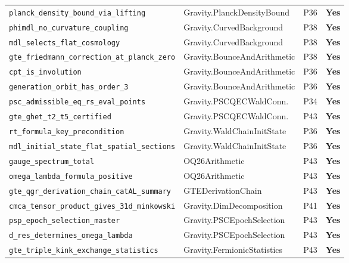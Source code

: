 \begin{longtable}{@{}p{6.3cm}p{4.6cm}p{1.5cm}p{1.5cm}@{}}
\lstinline|planck_density_bound_via_lifting|         & Gravity.PlanckDensityBound   & P36  & \textbf{Yes} \\
\lstinline|phimdl_no_curvature_coupling|             & Gravity.CurvedBackground     & P38  & \textbf{Yes} \\
\lstinline|mdl_selects_flat_cosmology|               & Gravity.CurvedBackground     & P38  & \textbf{Yes} \\
\texttt{gte\_friedmann\_correction\_\allowbreak at\_planck\_zero}  & Gravity.BounceAndArithmetic  & P38  & \textbf{Yes} \\
\lstinline|cpt_is_involution|                        & Gravity.BounceAndArithmetic  & P36  & \textbf{Yes} \\
\lstinline|generation_orbit_has_order_3|             & Gravity.BounceAndArithmetic  & P36  & \textbf{Yes} \\
\lstinline|psc_admissible_eq_rs_eval_points|         & Gravity.PSCQECWaldConn.      & P34  & \textbf{Yes} \\
\lstinline|gte_ghet_t2_t5_certified|                 & Gravity.PSCQECWaldConn.      & P43  & \textbf{Yes} \\
\lstinline|rt_formula_key_precondition|              & Gravity.WaldChainInitState   & P36  & \textbf{Yes} \\
\texttt{mdl\_initial\_state\_flat\_\allowbreak spatial\_sections}  & Gravity.WaldChainInitState   & P36  & \textbf{Yes} \\
\lstinline|gauge_spectrum_total|                     & OQ26Arithmetic               & P43  & \textbf{Yes} \\
\lstinline|omega_lambda_formula_positive|            & OQ26Arithmetic               & P43  & \textbf{Yes} \\
\texttt{gte\_qgr\_derivation\_chain\_\allowbreak catAL\_summary}  & GTEDerivationChain           & P43  & \textbf{Yes} \\
\texttt{cmca\_tensor\_product\_gives\_\allowbreak 31d\_minkowski}  & Gravity.DimDecomposition     & P41  & \textbf{Yes} \\
\lstinline|psp_epoch_selection_master|               & Gravity.PSCEpochSelection    & P43  & \textbf{Yes} \\
\lstinline|d_res_determines_omega_lambda|            & Gravity.PSCEpochSelection    & P43  & \textbf{Yes} \\
\texttt{gte\_triple\_kink\_\allowbreak exchange\_statistics}      & Gravity.FermionicStatistics  & P43  & \textbf{Yes} \\

\end{longtable}
